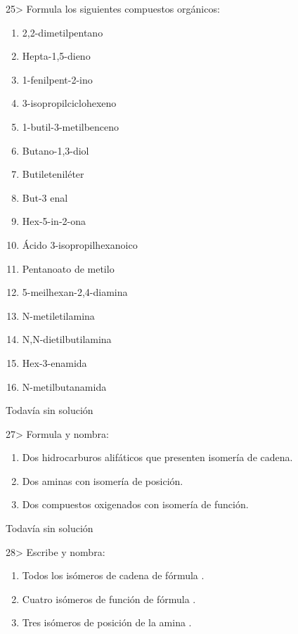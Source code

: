 \documentclass[twocolumn]{article}
\begin{document}
\begin{exercise}
  25> Formula los siguientes compuestos orgánicos:
  \begin{enumerate}
    \item 2,2-dimetilpentano
    \item Hepta-1,5-dieno
    \item 1-fenilpent-2-ino
    \item 3-isopropilciclohexeno
    \item 1-butil-3-metilbenceno
    \item Butano-1,3-diol
    \item Butileteniléter
    \item But-3 enal
    \item Hex-5-in-2-ona
    \item Ácido 3-isopropilhexanoico
    \item Pentanoato de metilo
    \item 5-meilhexan-2,4-diamina
    \item N-metiletilamina
    \item N,N-dietilbutilamina
    \item Hex-3-enamida
    \item N-metilbutanamida
  \end{enumerate}
\end{exercise}

\begin{solution}[print=false]
  Todavía sin solución
\end{solution}

\begin{exercise}
  27> Formula y nombra:
  \begin{enumerate}
    \item Dos hidrocarburos alifáticos que presenten isomería de cadena.
    \item Dos aminas con isomería de posición.
    \item Dos compuestos oxigenados con isomería de función.
  \end{enumerate}
\end{exercise}

\begin{solution}[print=false]
  Todavía sin solución
\end{solution}

\begin{exercise}
  28> Escribe y nombra:
  \begin{enumerate}
    \item Todos los isómeros de cadena de fórmula .
    \item Cuatro isómeros de función de fórmula .
    \item Tres isómeros de posición de la amina .
  \end{enumerate}
\end{exercise}
\end{document}
